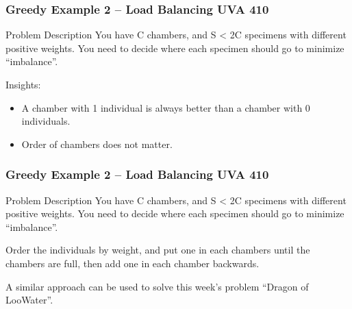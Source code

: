 \begin{frame}
  \frametitle{Greedy Example 2 -- Load Balancing UVA 410}

  \begin{block}{Problem Description}
  You have C chambers, and S < 2C specimens with different positive
  weights. You need to decide where each specimen should go to
  minimize ``imbalance''.
  \end{block}

  Insights:

  \begin{itemize}
  \item A chamber with 1 individual is always better than a chamber
    with 0 individuals.

    \medskip

  \item Order of chambers does not matter.
  \end{itemize}
\end{frame}

\begin{frame}
  \frametitle{Greedy Example 2 -- Load Balancing UVA 410}

  \begin{block}{Problem Description}
  You have C chambers, and S < 2C specimens with different positive
  weights. You need to decide where each specimen should go to
  minimize ``imbalance''.
  \end{block}

  \vfill

   Order the individuals by weight, and
  put one in each chambers until the chambers are full, then add one
  in each chamber backwards.

  \bigskip

  A similar approach can be used to solve this week's problem ``Dragon
  of LooWater''.
\end{frame}

